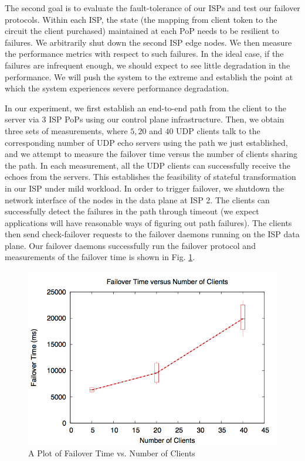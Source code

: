\documentclass{article}
\begin{document}
The second goal is to evaluate the fault-tolerance of our ISPs and test
our failover protocols.
 Within each ISP, the state (the mapping from client token to the circuit the
client purchased) maintained at each PoP needs to be resilient to
failures. We arbitrarily shut down the second ISP edge nodes. We
then measure the performance metrics with respect to such failures. In
the ideal case, if the failures are infrequent enough, we should
expect to see little degradation in the performance. We will push the
system to the extreme and establish the point at which the system
experiences severe performance degradation.

In our experiment, we first establish an end-to-end path from the client 
to the server via 3 ISP PoPs using our control plane infrastructure.
Then, we obtain three sets of measurements, where
 $5, 20$ and $40$ UDP clients talk to the corresponding
number of UDP echo servers using the path we just established, and
we attempt to measure the failover time versus the number of clients
sharing the path.
In each measurement, all the UDP clients can successfully receive
the echoes from the servers. This establishes the feasibility of
stateful transformation in our ISP under mild workload.
In order to trigger failover, we shutdown the network interface of the 
nodes in the data plane at ISP 2. The clients can successfully detect
the failures in the path through timeout (we expect applications will
have reasonable ways of figuring out path failures). The clients then
send check-failover requests to the failover daemons running on the
ISP data plane. Our failover daemons successfully run the failover
protocol and measurements of the failover time is shown in Fig. \ref{fig:failover}.

\begin{figure}
\includegraphics[width=\linewidth]{failoverTime_numClients}
\caption{A Plot of Failover Time vs. Number of Clients}
\label{fig:failover}
\end{figure}
\end{document}

